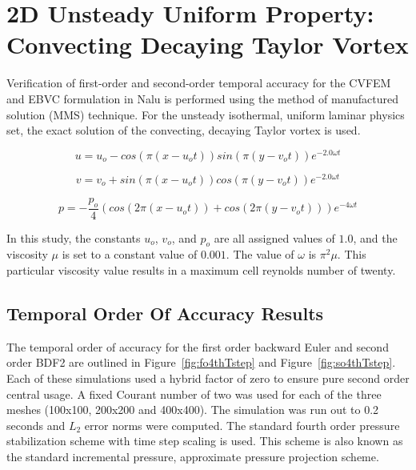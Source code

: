 \section{2D Unsteady Uniform Property: Convecting Decaying Taylor Vortex}

Verification of first-order and second-order temporal accuracy for the
CVFEM and EBVC formulation in Nalu is performed using the method of manufactured 
solution (MMS) technique. For the unsteady isothermal, uniform laminar physics set,
the exact solution of the convecting, decaying Taylor vortex is used.

\begin{equation}
  u = u_o - cos(\pi(x-u_ot)) sin(\pi(y-v_ot))e^{-2.0\omega t}
\label{advConvTV_u}
\end{equation}

\begin{equation}
  v = v_o + sin(\pi(x-u_ot)) cos(\pi(y-v_ot))e^{-2.0\omega t} 
\label{advConvTV_v}
\end{equation}

\begin{equation}
  p = -\frac{p_o}{4}(cos(2\pi(x-u_ot)) + cos(2\pi(y-v_ot)))e^{-4\omega t}
\label{advConvTV_p}
\end{equation}

In this study, the constants $u_o$, $v_o$, and $p_o$ are all assigned values of $1.0$,
and the viscosity $\mu$ is set to a
constant value of $0.001$. The value of $\omega$ is $\pi^2\mu$. This particular viscosity value 
results in a maximum cell reynolds number of twenty.  

\subsection{Temporal Order Of Accuracy Results}
The temporal order of accuracy for the first order backward Euler and second order BDF2
are outlined in Figure~\ref{fig:fo4thTstep} and Figure~\ref{fig:so4thTstep}. Each of these
simulations used a hybrid factor of zero to ensure pure second order central usage. A
fixed Courant number of two was used for each of the three meshes (100x100, 200x200 and 400x400).
The simulation was run out to 0.2 seconds and $L_2$ error norms were computed. The standard
fourth order pressure stabilization scheme with time step scaling is used. This scheme is also
known as the standard incremental pressure, approximate pressure projection scheme.

